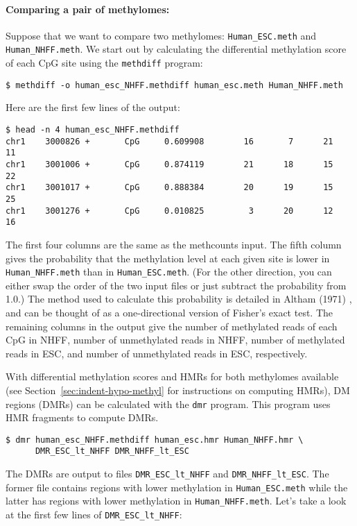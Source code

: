 \documentclass[10pt]{article}
\newcommand{\prog}[1]{\texttt{#1}}
\newcommand{\fn}[1]{\texttt{#1}}
\begin{document}
\paragraph{Comparing a pair of methylomes:}
Suppose that we want to compare two methylomes: {\tt Human\_ESC.meth} and
{\tt Human\_NHFF.meth}. We start out by calculating the differential
methylation score of each CpG site using the \prog{methdiff} program:
{\small{%
\begin{verbatim}
$ methdiff -o human_esc_NHFF.methdiff human_esc.meth Human_NHFF.meth
\end{verbatim}%
}}
Here are the first few lines of the output:
{\small{%
\begin{verbatim}
$ head -n 4 human_esc_NHFF.methdiff
chr1    3000826 +       CpG     0.609908        16       7      21      11
chr1    3001006 +       CpG     0.874119        21      18      15      22
chr1    3001017 +       CpG     0.888384        20      19      15      25
chr1    3001276 +       CpG     0.010825         3      20      12      16
\end{verbatim}%
}}

The first four columns are the same as the methcounts input. The fifth
column gives the probability that the methylation level at each given
site is lower in \fn{Human\_NHFF.meth} than in \fn{Human\_ESC.meth}.
(For the other direction, you can either swap the order of the two
input files or just subtract the probability from 1.0.) The method used
to calculate this probability is detailed in Altham (1971)
\cite{altham1969exact}, and can be thought of as a one-directional
version of Fisher's exact test.  The remaining columns in the output
give the number of methylated reads of each CpG in NHFF, number of unmethylated
reads in  NHFF, number of methylated reads in ESC, and number of unmethylated
reads in ESC, respectively.

With differential methylation scores and HMRs for both methylomes
available (see Section~\ref{sec:indent-hypo-methyl} for instructions
on computing HMRs), DM regions (DMRs) can be calculated with the
\prog{dmr} program. This program uses HMR fragments to compute
DMRs.

{\small{%
\begin{verbatim}
$ dmr human_esc_NHFF.methdiff human_esc.hmr Human_NHFF.hmr \
      DMR_ESC_lt_NHFF DMR_NHFF_lt_ESC
\end{verbatim}%
}}
The DMRs are output to files {\tt DMR\_ESC\_lt\_NHFF} and
{\tt DMR\_NHFF\_lt\_ESC}. The former file contains regions with
lower methylation in {\tt Human\_ESC.meth} while the latter  has
regions with lower methylation in {\tt Human\_NHFF.meth}. Let's take
a look at the first few lines of {\tt DMR\_ESC\_lt\_NHFF}:
\end{document}
